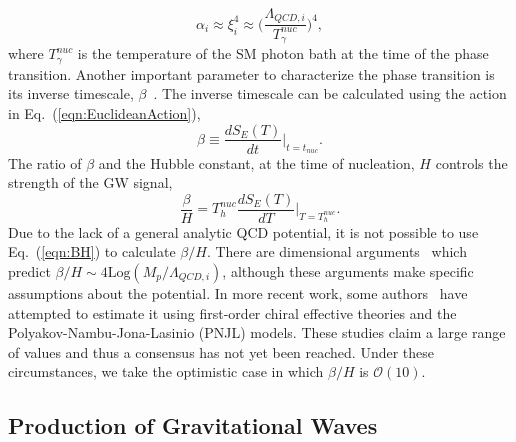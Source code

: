 \documentclass[nofootinbib,twocolumn,preprintnumbers]{revtex4-1}
\begin{document}
%
\begin{equation}\label{eqn:alpha2}
\alpha_i \approx \xi_i^{4} \approx \bigg( \frac{\Lambda_{QCD,i}}{T_{\gamma}^{nuc}}\bigg)^4,
\end{equation}
%
where $T_{\gamma}^{nuc}$ is the temperature of the SM photon bath at the time of the phase transition. Another important parameter to characterize the phase transition is its inverse timescale, $\beta$~\citep{Caprini:2015zlo}. The inverse timescale can be calculated using the action in Eq.~(\ref{eqn:EuclideanAction}), 
\begin{equation}
\beta  \equiv \frac{dS_{E}(T)}{dt}\bigg|_{t = t_{nuc}}.
\end{equation}
The ratio of $\beta$ and the Hubble constant, at the time of nucleation, $H$ controls the strength of the GW signal,
\begin{equation}\label{eqn:BH}
\frac{\beta}{H} = T^{nuc}_h \frac{dS_{E}(T)}{dT}\bigg|_{T = T^{nuc}_h}.
\end{equation}
Due to the lack of a general analytic QCD potential, it is not possible to use Eq.~(\ref{eqn:BH}) to calculate $\beta/H$. There are dimensional arguments~\cite{Hogan:1984hx,Hogan:1986qda} which predict $\beta/H \sim 4 \textrm{Log}(M_{p}/ \Lambda_{QCD,i})$, although these arguments make specific assumptions about the potential. In more recent work, some authors~\citep{Helmboldt:2019pan,Bai:2018dxf} have attempted to estimate it using first-order chiral effective theories and the Polyakov-Nambu-Jona-Lasinio (PNJL) models. These studies claim a large range of values and thus a consensus has not yet been reached.  Under these circumstances, we take the optimistic case in which $\beta/H$ is $\mathcal{O}(10)$.



\subsection{Production of Gravitational Waves}
\label{sec:signals}
\end{document}
